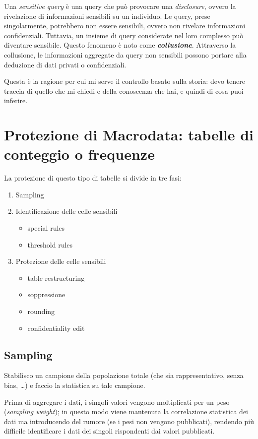 \documentclass{report}
\begin{document}
Una \textit{sensitive query} è una query che può provocare una \textit{disclosure}, ovvero la rivelazione di informazioni sensibili su un individuo.
Le query, prese singolarmente, potrebbero non essere sensibili, ovvero non rivelare informazioni confidenziali. 
Tuttavia, un insieme di query considerate nel loro complesso può diventare sensibile. Questo fenomeno è noto come \textit{\textbf{collusione}}. 
Attraverso la collusione, le informazioni aggregate da query non sensibili possono portare alla deduzione di dati privati o confidenziali.

Questa è la ragione per cui mi serve il controllo basato sulla 
storia: devo tenere traccia di quello che mi chiedi e della 
conoscenza che hai, e quindi di cosa puoi inferire.

\chapter{Protezione di Macrodata: tabelle di conteggio o frequenze}

La protezione di questo tipo di tabelle si divide in tre fasi:
\begin{enumerate}
    \item Sampling
    \item Identificazione delle celle sensibili
    \begin{itemize}
        \item special rules 
        \item threshold rules 
    \end{itemize}
    \item Protezione delle celle sensibili
    \begin{itemize}
        \item table restructuring
        \item soppressione 
        \item rounding 
        \item confidentiality edit
    \end{itemize}
\end{enumerate}

\section{Sampling}
Stabilisco un campione della popolazione totale (che sia rappresentativo, senza bias, \dots) 
e faccio la statistica su tale campione.

Prima di aggregare i dati, i singoli valori vengono moltiplicati per un peso (\textit{sampling weight});
in questo modo viene mantenuta la correlazione statistica dei dati ma introducendo del rumore (se i pesi non vengono pubblicati), rendendo 
più difficile identificare i dati dei singoli rispondenti dai valori pubblicati.
\end{document}
